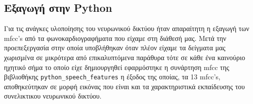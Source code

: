 \subsection{Eξαγωγή στην Python}
Για τις ανάγκες υλοποίησης του νευρωνικού δικτύου ήταν απαραίτητη η εξαγωγή των
mfcc's από τα φωνοκαρδιογραφήματα  που είχαμε στη διάθεσή μας. Μετά την
προεπεξεργασία στην οποία υποβλήθηκαν όταν πλέον είχαμε τα δείγματα μας
χωρισμένα σε μικρότερα από επικαλυπτόμενα παράθυρα τότε σε κάθε ένα καινούριο
ηχητικό σήμα το οποίο είχε δημιουργηθεί εφαρμόστηκε η συνάρτηση mfcc της
βιβλιοθήκης \verb|python_speech_features| η έξοδος της οποίας, τα 13 mfcc's,
αποθηκεύτηκαν σε μορφή εικόνας που είναι και τα χαρακτηριστικά εκπαίδευσης  του
συνελικτικου νευρωνικού δικτύου.
